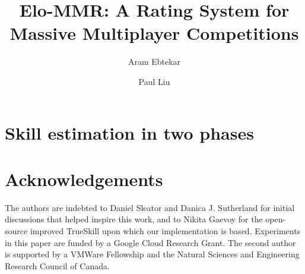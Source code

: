 \documentclass[sigconf,screen]{acmart}
\title{Elo-MMR: A Rating System for Massive Multiplayer Competitions}
\author{Aram Ebtekar}
\affiliation{%
  \city{Vancouver}
  \state{BC}
  \country{Canada}
}
\author{Paul Liu}
\affiliation{%
  \institution{Stanford University}
  \city{Stanford}
  \state{CA}
  \country{USA}
}
\begin{document}



\maketitle



\section{Skill estimation in two phases}
\label{sec:main-alg}
    
    






\section*{Acknowledgements}
The authors are indebted to Daniel Sleator and Danica J. Sutherland for initial discussions that helped inspire this work, and to Nikita Gaevoy for the open-source improved TrueSkill upon which our implementation is based. Experiments in this paper are funded by a Google Cloud Research Grant. The second author is supported by a VMWare Fellowship and the Natural Sciences and Engineering Research Council of Canada.

\balance

%



\end{document}
